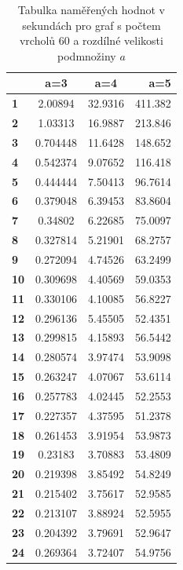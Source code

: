 \documentclass[a4paper,10pt]{report}
\begin{document}
\begin{table}[H]
	\centering
	\begin{tabular}{ | l | c | c | r | }
		\hline
		 & \textbf{a=3} & \textbf{a=4} & \textbf{a=5} \\ \hline
		\textbf{1} & 2.00894 & 32.9316 & 411.382 \\ \hline
		\textbf{2} & 1.03313 & 16.9887 & 213.846 \\ \hline
		\textbf{3} & 0.704448 & 11.6428 & 148.652 \\ \hline
		\textbf{4} & 0.542374 & 9.07652 & 116.418 \\ \hline
		\textbf{5} & 0.444444 & 7.50413 & 96.7614 \\ \hline
		\textbf{6} & 0.379048 & 6.39453 & 83.8604 \\ \hline
		\textbf{7} & 0.34802 & 6.22685 & 75.0097 \\ \hline
		\textbf{8} & 0.327814 & 5.21901 & 68.2757 \\ \hline
		\textbf{9} & 0.272094 & 4.74526 & 63.2499 \\ \hline
		\textbf{10} & 0.309698 & 4.40569 & 59.0353 \\ \hline
		\textbf{11} & 0.330106 & 4.10085 & 56.8227 \\ \hline
		\textbf{12} & 0.296136 & 5.45505 & 52.4351 \\ \hline
		\textbf{13} & 0.299815 & 4.15893 & 56.5442 \\ \hline
		\textbf{14} & 0.280574 & 3.97474 & 53.9098 \\ \hline
		\textbf{15} & 0.263247 & 4.07067 & 53.6114 \\ \hline
		\textbf{16} & 0.257783 & 4.02445 & 52.2553 \\ \hline
		\textbf{17} & 0.227357 & 4.37595 & 51.2378 \\ \hline
		\textbf{18} & 0.261453 & 3.91954 & 53.9873 \\ \hline
		\textbf{19} & 0.23183 & 3.70883 & 53.4809 \\ \hline
		\textbf{20} & 0.219398 & 3.85492 & 54.8249 \\ \hline
		\textbf{21} & 0.215402 & 3.75617 & 52.9585 \\ \hline
		\textbf{22} & 0.213107 & 3.88924 & 52.5955 \\ \hline
		\textbf{23} & 0.204392 & 3.79691 & 52.9647 \\ \hline
		\textbf{24} & 0.269364 & 3.72407 & 54.9756 \\ \hline
	\end{tabular}
	\caption{Tabulka naměřených hodnot v sekundách pro graf s počtem vrcholů 60 a rozdílné velikosti podmnožiny $a$}
   \label{fig:spe}
\end{table}
\end{document}
